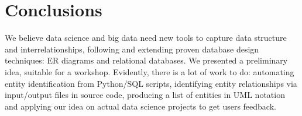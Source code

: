 \documentclass[sigconf,edbt]{acmart-edbt-workshops}
\newcommand{\+}{\discretionary{\mbox{${\bm\cdot}\mkern-1mu$}}{}{}}
\begin{document}
\section{Conclusions}

We believe data science and big data need
new tools to capture data structure and interrelationships,
following and extending proven database design techniques: ER diagrams
and relational databases.
We presented a preliminary idea, suitable for a workshop.
Evidently, there is a lot of work to do:
automating entity identification from Python/SQL scripts,
identifying entity relationships via input/output files
in source code,
producing a list of entities in UML notation
and applying our idea on actual data science projects to get
users feedback.




\end{document}
